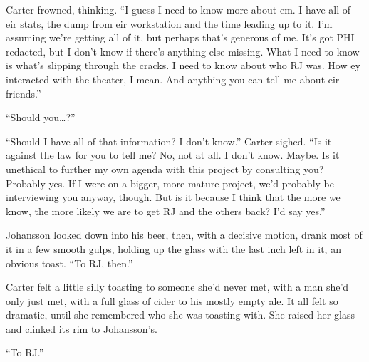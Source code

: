 Carter frowned, thinking. ``I guess I need to know more about em. I have all of eir stats, the dump from eir workstation and the time leading up to it. I'm assuming we're getting all of it, but perhaps that's generous of me. It's got PHI redacted, but I don't know if there's anything else missing. What I need to know is what's slipping through the cracks. I need to know about who RJ was. How ey interacted with the theater, I mean. And anything you can tell me about eir friends.''

``Should you\ldots{}?''

``Should I have all of that information? I don't know.'' Carter sighed. ``Is it against the law for you to tell me? No, not at all. I don't know. Maybe. Is it unethical to further my own agenda with this project by consulting you? Probably yes. If I were on a bigger, more mature project, we'd probably be interviewing you anyway, though. But is it because I think that the more we know, the more likely we are to get RJ and the others back? I'd say yes.''

Johansson looked down into his beer, then, with a decisive motion, drank most of it in a few smooth gulps, holding up the glass with the last inch left in it, an obvious toast. ``To RJ, then.''

Carter felt a little silly toasting to someone she'd never met, with a man she'd only just met, with a full glass of cider to his mostly empty ale. It all felt so dramatic, until she remembered who she was toasting with. She raised her glass and clinked its rim to Johansson's.

``To RJ.''
